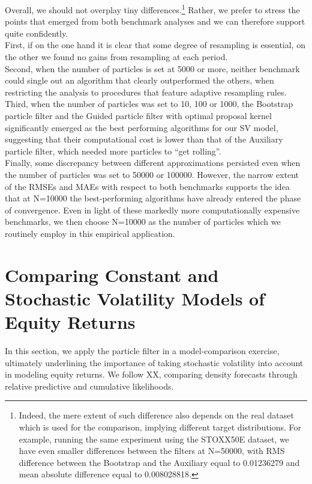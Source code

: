 \documentclass[
]{book}
\theoremstyle{break}
\theoremstyle{nonumberplain}
\begin{document}
Overall, we should not overplay tiny
differences.\footnote{Indeed, the mere extent of such difference also depends on the real dataset which is used for the comparison, implying different target distributions. For example, running the same experiment using the STOXX50E dataset, we have even smaller differences between the filters at N=50000, with RMS difference between the Bootstrap and the Auxiliary equal to 0.01236279 and mean absolute difference equal to 0.008028818.}
Rather, we prefer to stress the points that emerged from both benchmark
analyses and we can therefore support quite confidently.\\
First, if on the one hand it is clear that some degree of resampling is
essential, on the other we found no gains from resampling at each
period.\\
Second, when the number of particles is set at 5000 or more, neither
benchmark could single out an algorithm that clearly outperformed the
others, when restricting the analysis to procedures that feature
adaptive resampling rules.\\
Third, when the number of particles was set to 10, 100 or 1000, the
Bootstrap particle filter and the Guided particle filter with optimal
proposal kernel significantly emerged as the best performing algorithms
for our SV model, suggesting that their computational cost is lower than
that of the Auxiliary particle filter, which needed more particles to
``get rolling''.\\
Finally, some discrepancy between different approximations persisted
even when the number of particles was set to 50000 or 100000. However,
the narrow extent of the RMSEs and MAEs with respect to both benchmarks
supports the idea that at N=10000 the best-performing algorithms have
already entered the phase of convergence. Even in light of these
markedly more computationally expensive benchmarks, we then choose
N=10000 as the number of particles which we routinely employ in this
empirical application.

\section{Comparing Constant and Stochastic Volatility Models of Equity Returns}

In this section, we apply the particle filter in a model-comparison
exercise, ultimately underlining the importance of taking stochastic
volatility into account in modeling equity returns. We follow XX,
comparing density forecasts through relative predictive and cumulative
likelihoods.
\end{document}
